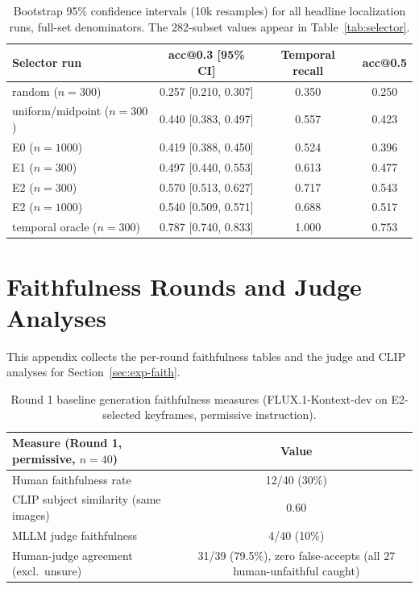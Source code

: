 \begin{table}[htbp]
\centering
\small
\begin{tabular}{lccc}
\toprule
Selector run & acc@0.3 [95\% CI] & Temporal recall & acc@0.5 \\
\midrule
random ($n=300$) & 0.257 [0.210, 0.307] & 0.350 & 0.250 \\
uniform/midpoint ($n=300$) & 0.440 [0.383, 0.497] & 0.557 & 0.423 \\
E0 ($n=1000$) & 0.419 [0.388, 0.450] & 0.524 & 0.396 \\
E1 ($n=300$) & 0.497 [0.440, 0.553] & 0.613 & 0.477 \\
E2 ($n=300$) & 0.570 [0.513, 0.627] & 0.717 & 0.543 \\
E2 ($n=1000$) & 0.540 [0.509, 0.571] & 0.688 & 0.517 \\
temporal oracle ($n=300$) & 0.787 [0.740, 0.833] & 1.000 & 0.753 \\
\bottomrule
\end{tabular}
\caption{Bootstrap 95\% confidence intervals (10k resamples) for all headline localization runs, full-set denominators. The 282-subset values appear in Table~\ref{tab:selector}.}
\label{tab:ci}
\end{table}

\section{Faithfulness Rounds and Judge Analyses}\label{app:judge}

This appendix collects the per-round faithfulness tables and the judge and CLIP analyses for Section~\ref{sec:exp-faith}.

\begin{table}[htbp]
\centering
\small
\begin{tabular}{lc}
\toprule
Measure (Round 1, permissive, $n=40$) & Value \\
\midrule
Human faithfulness rate & 12/40 (30\%) \\
CLIP subject similarity (same images) & 0.60 \\
MLLM judge faithfulness & 4/40 (10\%) \\
Human-judge agreement (excl.\ unsure) & 31/39 (79.5\%), zero false-accepts (all 27 human-unfaithful caught) \\
\bottomrule
\end{tabular}
\caption{Round 1 baseline generation faithfulness measures (FLUX.1-Kontext-dev on E2-selected keyframes, permissive instruction).}
\label{tab:round1}
\end{table}

